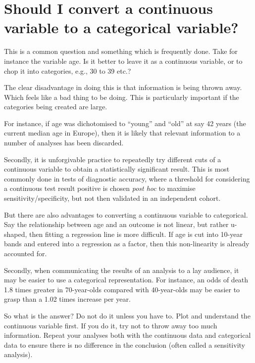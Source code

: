 \documentclass[
  12pt,
  krantz2]{krantz}
\begin{document}

\hypertarget{should-i-convert-a-continuous-variable-to-a-categorical-variable}{%
\section{Should I convert a continuous variable to a categorical variable?}\label{should-i-convert-a-continuous-variable-to-a-categorical-variable}}


This is a common question and something which is frequently done.
Take for instance the variable age.
Is it better to leave it as a continuous variable, or to chop it into categories, e.g., 30 to 39 etc.?

The clear disadvantage in doing this is that information is being thrown away.
Which feels like a bad thing to be doing.
This is particularly important if the categories being created are large.

For instance, if age was dichotomised to ``young'' and ``old'' at say 42 years (the current median age in Europe), then it is likely that relevant information to a number of analyses has been discarded.

Secondly, it is unforgivable practice to repeatedly try different cuts of a continuous variable to obtain a statistically significant result.
This is most commonly done in tests of diagnostic accuracy, where a threshold for considering a continuous test result positive is chosen \emph{post hoc} to maximise sensitivity/specificity, but not then validated in an independent cohort.

But there are also advantages to converting a continuous variable to categorical.
Say the relationship between age and an outcome is not linear, but rather u-shaped, then fitting a regression line is more difficult.
If age is cut into 10-year bands and entered into a regression as a factor, then this non-linearity is already accounted for.

Secondly, when communicating the results of an analysis to a lay audience, it may be easier to use a categorical representation.
For instance, an odds of death 1.8 times greater in 70-year-olds compared with 40-year-olds may be easier to grasp than a 1.02 times increase per year.

So what is the answer?
Do not do it unless you have to.
Plot and understand the continuous variable first.
If you do it, try not to throw away too much information.
Repeat your analyses both with the continuous data and categorical data to ensure there is no difference in the conclusion (often called a sensitivity analysis).
\end{document}

